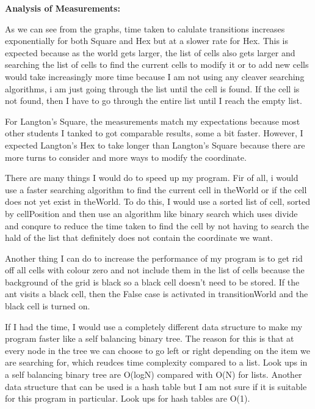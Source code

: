 \documentclass[12pt]{article}
\begin{document}
\break

\large{\textbf{Analysis of Measurements: }}

As we can see from the graphs, time taken to calulate transitions increases exponentially for both Square and Hex but at a slower rate for Hex. This is expected because as the world gets larger, the list of cells also gets larger and searching the list of cells to find the current cells to modify it or to add new cells would take increasingly more time because I am not using any cleaver searching algorithms, i am just going through the list until the cell is found.  If the cell is not found, then I have to go through the entire list until I reach the empty list.

For Langton's Square, the measurements match my expectations because most other students I tanked to got comparable results, some a bit faster. However, I expected Langton's Hex to take longer than Langton's Square because there are more turns to consider and more ways to modify the coordinate.

There are many things I would do to speed up my program. Fir of all, i would use a faster searching algorithm to find the current cell in theWorld or if the cell does not yet exist in theWorld. To do this, I would use a sorted list of cell, sorted by cellPosition and then use an algorithm like binary search which uses divide and conqure to reduce the time taken to find the cell by not having to search the hald of the list that definitely does not contain the coordinate we want.

Another thing I can do to increase the performance of my program is to get rid off all cells with colour zero and not include them in the list of cells because the background of the grid is black so a black cell doesn't need to be stored. If the ant visits a black cell, then the False case is activated in transitionWorld and the black cell is turned on.

If I had the time, I would use a completely different data structure to make my program faster like a self balancing binary tree. The reason for this is that at every node in the tree we can choose to go left or right depending on the item we are searching for, which reudces time complexity compared to a list. Look ups in a self balancing binary tree are O(logN) compared with O(N) for lists. Another data structure that can be used is a hash table but I am not sure if it is suitable for this program in particular. Look ups for hash tables are O(1).

\break
\end{document}
